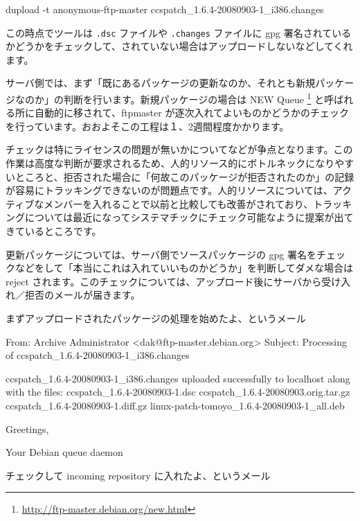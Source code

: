 \documentclass[mingoth,a4paper]{jsarticle}
\begin{document}
\begin{commandline}
dupload -t anonymous-ftp-master ccspatch_1.6.4-20080903-1_i386.changes
\end{commandline}

この時点でツールは \texttt{.dsc} ファイルや \texttt{.changes} ファイルに gpg 署名されているかどうかをチェックして、されていない場合はアップロードしないなどしてくれます。

サーバ側では、まず「既にあるパッケージの更新なのか、それとも新規パッケージなのか」の判断を行います。新規パッケージの場合は NEW Queue \footnote{\url{http://ftp-master.debian.org/new.html}} と呼ばれる所に自動的に移されて、ftpmaster が逐次入れてよいものかどうかのチェックを行っています。おおよそこの工程は１、2週間程度かかります。

チェックは特にライセンスの問題が無いかについてなどが争点となります。この作業は高度な判断が要求されるため、人的リソース的にボトルネックになりやすいところと、拒否された場合に「何故このパッケージが拒否されたのか」の記録が容易にトラッキングできないのが問題点です。人的リソースについては、アクティブなメンバーを入れることで以前と比較しても改善がされており、トラッキングについては最近になってシステマチックにチェック可能なように提案が出てきているところです。

更新パッケージについては、サーバ側でソースパッケージの gpg 署名をチェックなどをして「本当にこれは入れていいものかどうか」を判断してダメな場合は reject されます。このチェックについては、アップロード後にサーバから受け入れ／拒否のメールが届きます。

まずアップロードされたパッケージの処理を始めたよ、というメール

\begin{commandline}
From: Archive Administrator <dak@ftp-master.debian.org>
Subject: Processing of ccspatch_1.6.4-20080903-1_i386.changes

ccspatch_1.6.4-20080903-1_i386.changes uploaded successfully to localhost
along with the files:
  ccspatch_1.6.4-20080903-1.dsc
  ccspatch_1.6.4-20080903.orig.tar.gz
  ccspatch_1.6.4-20080903-1.diff.gz
  linux-patch-tomoyo_1.6.4-20080903-1_all.deb

Greetings,

	Your Debian queue daemon
\end{commandline}


チェックして incoming repository に入れたよ、というメール
\end{document}
